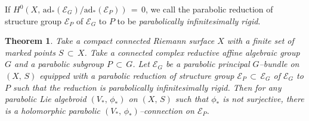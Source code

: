 \documentclass[12pt, reqno]{amsart}
\numberwithin{equation}{section}
\newtheorem{theorem}{Theorem}[section]
\newcommand{\ad}{\textrm{ad}}
\begin{document}
If $H^{0}(X,\,\ad_{*}(\mathcal{E}_{G})/\ad_{*}(\mathcal{E}_{P}))\,=\,0$,
we call the parabolic reduction of structure group $\mathcal{E}_{P}$ of $\mathcal{E}_{G}$ to $P$
to be {\it parabolically infinitesimally rigid}. 

\begin{theorem}\label{MAIN}
Take a compact connected Riemann surface $X$ with a finite set of marked points $S\, \subset\, X$.
Take a connected complex reductive affine algebraic group $G$ and a parabolic subgroup $P\, \subset\, G$.
Let $\mathcal{E}_{G}$ be a parabolic principal $G$--bundle on $(X,\,S)$ equipped with a
parabolic reduction of structure group $\mathcal{E}_{P}\, \subset\, \mathcal{E}_{G}$ of
$\mathcal{E}_{G}$ to $P$ such that the reduction is parabolically infinitesimally rigid.
Then for any parabolic Lie algebroid $(V_{*},\, \phi_{*})$ on $(X,\,S)$ such that
$\phi_{*}$ is not surjective, there is a holomorphic parabolic $(V_{*},\, \phi_{*})$--connection
on $\mathcal{E}_{P}$.
\end{theorem}
\end{document}
